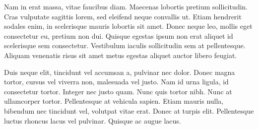 Nam in erat massa, vitae faucibus diam. Maecenas lobortis pretium
sollicitudin. Cras vulputate sagittis lorem, sed eleifend neque
convallis ut. Etiam hendrerit sodales enim, in scelerisque mauris
lobortis sit amet. Donec neque leo, mollis eget consectetur eu,
pretium non dui. Quisque egestas ipsum non erat aliquet id scelerisque
sem consectetur. Vestibulum iaculis sollicitudin sem at
pellentesque. Aliquam venenatis risus sit amet metus egestas aliquet
auctor libero feugiat.

Duis neque elit, tincidunt vel accumsan a, pulvinar nec dolor. Donec
magna tortor, cursus vel viverra non, malesuada vel justo. Nam id urna
ligula, id consectetur tortor. Integer nec justo quam. Nunc quis
tortor nibh. Nunc at ullamcorper tortor. Pellentesque at vehicula
sapien. Etiam mauris nulla, bibendum nec tincidunt vel, volutpat vitae
erat. Donec at turpis elit. Pellentesque luctus rhoncus lacus vel
pulvinar. Quisque ac augue lacus.

